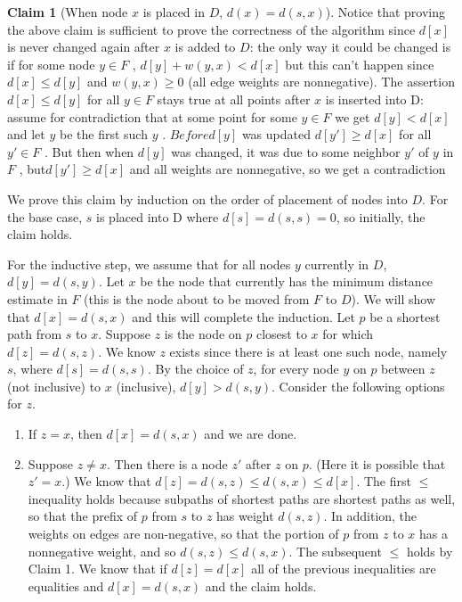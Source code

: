 \documentclass [12pt]{article}
\theoremstyle{definition}
\newtheorem{claim}{Claim}
\begin{document}
\begin{claim}[When node $x$ is placed in $D$, $d(x) = d(s,x)$] 
\vspace{1em}

Notice that proving the above claim is sufficient to prove the correctness of the algorithm since $d[x]$ is never changed again after $x$ is added to $D$: the only way it could be changed is if for some node $y \in F$ , $d[y] + w(y, x) < d[x]$ but this can't happen since $d[x] \leq d[y ]$ and $w(y, x) \geq 0$ (all edge weights are nonnegative). The assertion $d[x] \leq d[y]$ for all $y \in F$ stays true at all points after $x$ is inserted into D: assume for contradiction that at some point for some $y \in F$ we get $d[y ] < d[x]$ and let $y$ be the first such $y$ . $Before d[y ]$ was updated $d[y' ] \geq d[x]$ for all $y' \in F$ . But then when $d[y ]$ was changed, it was due to some neighbor $y'$ of $y$ in $F$ , but$ d[y' ] \geq d[x]$ and all weights are nonnegative, so we get a contradiction 

We prove this claim by induction on the order of placement of nodes into $D$. For the base case, $s$ is placed into D where $d[s] = d(s, s) = 0$, so initially, the claim holds. 

For the inductive step, we assume that for all nodes $y$ currently in $D$, $d[y ] = d(s, y )$. Let $x$ be the node that currently has the minimum distance estimate in $F$ (this is the node about to be moved from $F$ to $D$). We will show that $d[x] = d(s, x)$ and this will complete the induction. Let $p$ be a shortest path from $s$ to $x$. Suppose $z$ is the node on $p$ closest to $x$ for which $d[z] = d(s, z)$. We know $z$ exists since there is at least one such node, namely $s$, where $d[s] = d(s, s)$. By the choice of $z$, for every node $y$ on $p$ between $z$ (not inclusive) to $x$ (inclusive), $d[y ] > d(s, y )$. Consider the following options for $z$.

\begin{enumerate} 
    \item If $z = x$, then $d[x] = d(s, x)$ and we are done.
    \item Suppose $z \neq x$. Then there is a node $z'$ after $z$ on $p$. (Here it is possible that $z' = x$.) We know that $d[z] = d(s, z) \leq d(s, x) \leq d[x]$. The first $\leq$ inequality holds because subpaths of shortest paths are shortest paths as well, so that the prefix of $p$ from $s$ to $z$ has weight $d(s, z)$. In addition, the weights on edges are non-negative, so that the portion of $ p$ from $z$ to $x$ has a nonnegative weight, and so $d(s, z) \leq d(s, x)$. The subsequent $\leq $ holds by Claim 1. We know that if $d[z] = d[x]$ all of the previous inequalities are equalities and $d[x] = d(s, x)$ and the claim holds. 


\end{enumerate}
\end{claim}
\end{document}
